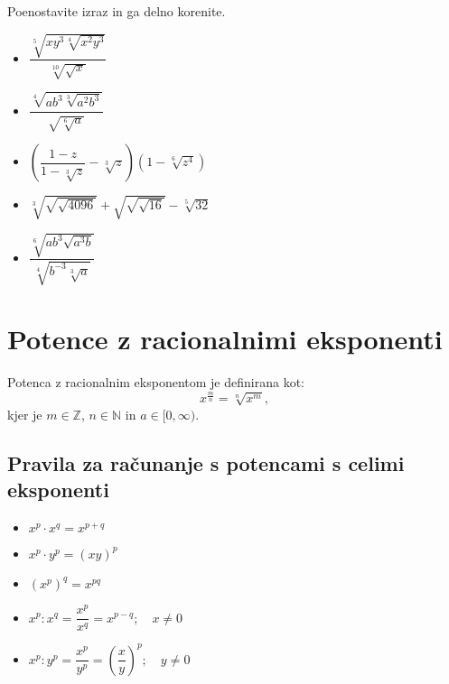         
            \begin{naloga}
                Poenostavite izraz in ga delno korenite.
                \begin{multicols}{2}
                    \begin{itemize}
                        \item $\displaystyle \dfrac{\sqrt[5]{xy^3\sqrt[4]{x^2y^3}}}{\sqrt[10]{\sqrt{x}}}$ 
                        \item $\displaystyle \dfrac{\sqrt[4]{ab^3\sqrt[3]{a^2b^3}}}{\sqrt{\sqrt[6]{a}}}$ 
                        \item $\displaystyle \left(\dfrac{1-z}{1-\sqrt[3]{z}}-\sqrt[3]{z}\right)\left(1-\sqrt[6]{z^4}\right)$ 
                        \item $\displaystyle \sqrt[3]{\sqrt{\sqrt{4096}}}+\sqrt{\sqrt{\sqrt{16}}}-\sqrt[5]{32}$ 
                        \item $\displaystyle \dfrac{\sqrt[6]{ab^3\sqrt{a^3b}}}{\sqrt[4]{b^{-3}\sqrt[3]{a}}}$ 
                    \end{itemize}
                \end{multicols}
            \end{naloga}
        



            \newpage
    \section{Potence z racionalnimi eksponenti}

        

            Potenca z racionalnim eksponentom je definirana kot: 
                $$\displaystyle x^\frac{m}{n}=\sqrt[n]{x^m},$$
                kjer je $m\in\mathbb{Z}$, $n\in\mathbb{N}$ in $a\in[0,\infty)$.
            

            \subsection*{Pravila za računanje s potencami s celimi eksponenti}
                \begin{multicols}{2}
                    \begin{itemize}
                        \item $\displaystyle x^p\cdot x^q=x^{p+q}$
                        \item $\displaystyle x^p\cdot y^p=(xy)^p$
                        \item $\displaystyle \left(x^p\right)^q=x^{pq}$
                        \item $\displaystyle x^p:x^q=\dfrac{x^p}{x^q}=x^{p-q}; \quad x\neq 0$
                        \item $\displaystyle x^p:y^p=\dfrac{x^p}{y^p}=\left(\dfrac{x}{y}\right)^p; \quad y\neq 0$
                    \end{itemize}
                \end{multicols}
                
